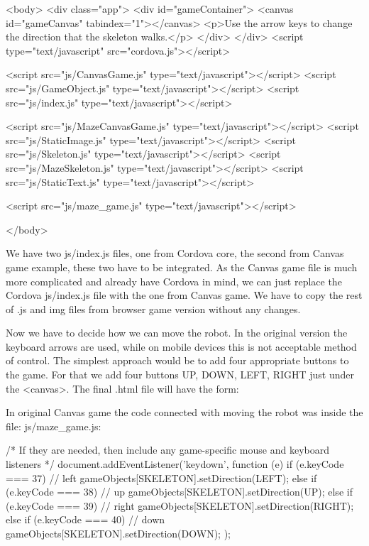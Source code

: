 \begin{html}
<body>
    <div class="app">
        <div id="gameContainer">
           <canvas id="gameCanvas" tabindex="1"></canvas>
           <p>Use the arrow keys to change the direction that the skeleton walks.</p>
        </div>
    </div>
    <script type="text/javascript" src="cordova.js"></script>

    <script src="js/CanvasGame.js" type="text/javascript"></script>
    <script src="js/GameObject.js" type="text/javascript"></script>
    <script src="js/index.js" type="text/javascript"></script>

    <script src="js/MazeCanvasGame.js" type="text/javascript"></script>
    <script src="js/StaticImage.js" type="text/javascript"></script>
    <script src="js/Skeleton.js" type="text/javascript"></script>
    <script src="js/MazeSkeleton.js" type="text/javascript"></script>
    <script src="js/StaticText.js" type="text/javascript"></script>


    <script src="js/maze_game.js" type="text/javascript"></script>

</body>
\end{html}
We have two js/index.js files, one from Cordova core, the second from Canvas game example, these two have to be integrated. As the Canvas game file is much more complicated and already have Cordova in mind, we can just replace the Cordova js/index.js file with the one from Canvas game. We have to copy the rest of .js and img files from browser game version without any changes.

Now we have to decide how we can move the robot. In the original version the keyboard arrows are used, while on mobile devices this is not acceptable method of control. The simplest approach would be to add four appropriate buttons to the game. For that we add four buttons UP, DOWN, LEFT, RIGHT just under the <canvas>. The final .html file will have the form:


In original Canvas game the code connected with moving the robot was inside the file: js/maze\_game.js:
\begin{js}
/* If they are needed, then include any game-specific mouse and keyboard listeners */
    document.addEventListener('keydown', function (e)
    {
        if (e.keyCode === 37)  // left
        {
            gameObjects[SKELETON].setDirection(LEFT);
        }
        else if (e.keyCode === 38) // up
        {
            gameObjects[SKELETON].setDirection(UP);
        }
        else if (e.keyCode === 39) // right
        {
            gameObjects[SKELETON].setDirection(RIGHT);
        }
        else if (e.keyCode === 40) // down
        {
            gameObjects[SKELETON].setDirection(DOWN);
        }
    });
\end{js}

